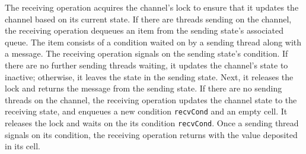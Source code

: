 \documentclass[letterpaper, 11pt]{extarticle}
\begin{document}
The receiving operation acquires the channel's lock
to ensure that it updates the channel based on
its current state.  If there are threads
sending on the channel, the receiving 
operation dequeues an item from the sending state's associated queue.  The item consists of a condition
waited on by a sending thread along with a message.
The receiving operation signals on the sending state's condition.
If there are no further sending threads waiting, it updates the channel's state to inactive; otherwise,
it leaves the state in the sending state.
Next, it releases the lock and returns the message from the sending state.
If there are no sending threads on the
channel, the receiving operation updates the channel state to the receiving state, and enqueues
a new condition \lstinline{recvCond} and an empty cell.  It releases the lock and waits on
the its condition \lstinline{recvCond}.  Once a sending thread signals on its condition,
the receiving operation returns with the value deposited in its cell.
\end{document}
